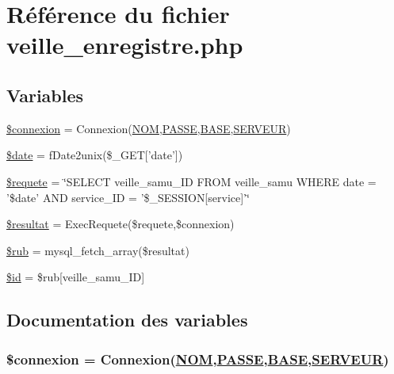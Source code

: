 \hypertarget{veille__enregistre_8php}{
\section{R\'{e}f\'{e}rence du fichier veille\_\-enregistre.php}
\label{veille__enregistre_8php}
}
\subsection*{Variables}
\begin{CompactItemize}
\item 
\hyperlink{veille__enregistre_8php_a0}{\$connexion} = Connexion(\hyperlink{pma__connect_8php_a0}{NOM},\hyperlink{pma__connect_8php_a1}{PASSE},\hyperlink{pma__connect_8php_a3}{BASE},\hyperlink{pma__connect_8php_a2}{SERVEUR})
\item 
\hyperlink{veille__enregistre_8php_a1}{\$date} = f\-Date2unix(\$\_\-GET\mbox{[}'date'\mbox{]})
\item 
\hyperlink{veille__enregistre_8php_a2}{\$requete} = \char`\"{}SELECT veille\_\-samu\_\-ID FROM veille\_\-samu WHERE date = '\$date' AND service\_\-ID = '\$\_\-SESSION\mbox{[}service\mbox{]}'\char`\"{}
\item 
\hyperlink{veille__enregistre_8php_a3}{\$resultat} = Exec\-Requete(\$requete,\$connexion)
\item 
\hyperlink{veille__enregistre_8php_a4}{\$rub} = mysql\_\-fetch\_\-array(\$resultat)
\item 
\hyperlink{veille__enregistre_8php_a5}{\$id} = \$rub\mbox{[}veille\_\-samu\_\-ID\mbox{]}
\end{CompactItemize}


\subsection{Documentation des variables}
\hypertarget{veille__enregistre_8php_a0}{
\subsubsection[\$connexion]{\setlength{\rightskip}{0pt plus 5cm}\$connexion = Connexion(\hyperlink{pma__connect_8php_a0}{NOM},\hyperlink{pma__connect_8php_a1}{PASSE},\hyperlink{pma__connect_8php_a3}{BASE},\hyperlink{pma__connect_8php_a2}{SERVEUR})}}
\label{veille__enregistre_8php_a0}


